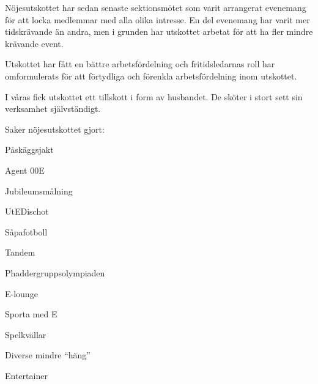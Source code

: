 \documentclass[../_main/handlingar.tex]{subfiles}
\begin{document}
Nöjesutskottet har sedan senaste sektionsmötet som varit arrangerat evenemang för att locka medlemmar med alla olika intresse. En del evenemang har varit mer tidskrävande än andra, men i grunden har utskottet arbetat för att ha fler mindre krävande event.

Utskottet har fått en bättre arbetsfördelning och fritidsledarnas roll har omformulerats för att förtydliga och förenkla arbetsfördelning inom utskottet.

I våras fick utskottet ett tillskott i form av husbandet. De sköter i stort sett sin verksamhet självständigt.

Saker nöjesutskottet gjort:
\begin{dashlist}
    \item Påskäggsjakt
    \item Agent 00E
    \item Jubileumsmålning
    \item UtEDischot
    \item Såpafotboll
    \item Tandem
    \item Phaddergruppsolympiaden
    \item E-lounge
    \item Sporta med E
    \item Spelkvällar
    \item Diverse mindre ``häng''
\end{dashlist}

\begin{signatures}{1}
    \mvh
    \signature{Albin Nyström Eklund}{Entertainer}
\end{signatures}
\end{document}
